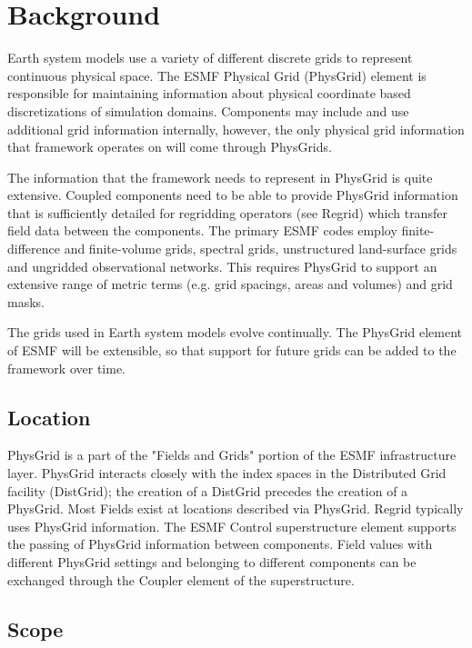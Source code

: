 
\section{Background}


  Earth system models use a variety of different discrete grids to represent
continuous physical space. The ESMF Physical Grid (PhysGrid) element is 
responsible for maintaining information about physical coordinate based 
discretizations of simulation domains. Components may include and use 
additional grid information internally, however, the only physical grid 
information that framework operates on will come through PhysGrids. 

  The information that the framework needs to represent in PhysGrid is  quite
extensive. Coupled components need to be able to provide PhysGrid  information
that is sufficiently detailed for regridding operators (see Regrid) which
transfer field data between the components.  The primary ESMF codes employ
finite-difference and finite-volume grids, spectral grids, unstructured
land-surface grids and ungridded observational networks.  This requires
PhysGrid to support an extensive range of metric terms (e.g. grid spacings,
areas and volumes) and grid masks.

 The grids used in Earth system models evolve continually. The PhysGrid
element of ESMF will be extensible, so that support for future
grids can be added to the framework over time.

\subsection{Location}

  PhysGrid is a part of the "Fields and Grids" portion of the ESMF
infrastructure layer. PhysGrid interacts closely with the index spaces in the 
Distributed Grid facility (DistGrid); the creation of a DistGrid precedes the 
creation of a PhysGrid.  Most Fields exist at locations described via PhysGrid.  
Regrid typically uses PhysGrid information. The ESMF Control
superstructure element supports the passing of PhysGrid information between
components. Field values with different PhysGrid settings and belonging
to different components can be exchanged through the Coupler element of the 
superstructure.

\subsection{Scope}

